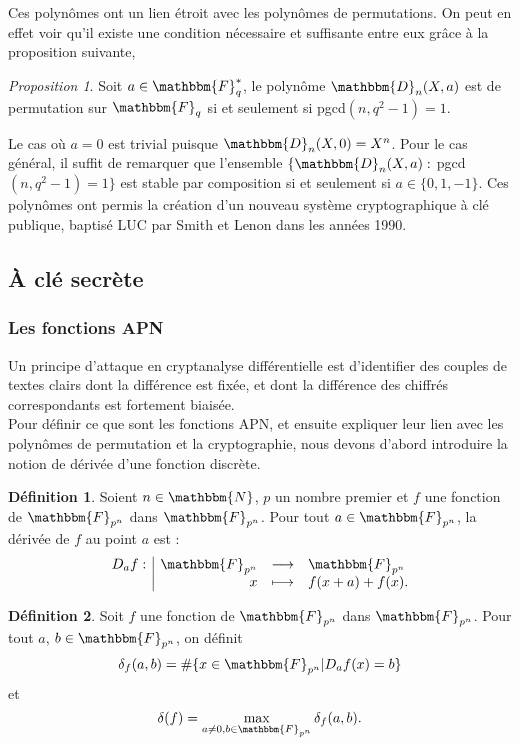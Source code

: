 \documentclass[12pt]{article}
\newcommand{\fonction}[5]{
\begin{displaymath}
\begin{array}{l|rcl}
\displaystyle
#1 : & #2 & \longrightarrow & #3 \\
    & #4 & \longmapsto & #5
\end{array}
\end{displaymath}
}
\theoremstyle{remark}\newtheorem{note}{Note}
\theoremstyle{remark}\newtheorem{nota}{Notation}
\newcommand{\F}{\mathbbm{F}}
\newtheorem{prop}{Proposition}
\theoremstyle{definition}
\newtheorem{definition}{Définition}
\begin{document}
Ces polynômes ont un lien étroit avec les polynômes de permutations. On peut en effet voir qu'il existe une condition nécessaire et suffisante entre eux grâce à la proposition suivante,
\begin{prop}
Soit $a \in \F_q^{*}$, le polynôme $\mathbbm{D}_n(X, a)$ est de permutation sur $\F_q$ si et seulement si pgcd$(n, q^2 -1) = 1$.
\end{prop}
Le cas où $a = 0$ est trivial puisque $\mathbbm{D}_n(X, 0) = X^n$. Pour le cas général, il suffit de remarquer que l'ensemble $ \{ \mathbbm{D}_n(X, a) :  $ pgcd$(n, q^2 -1) = 1 \}$ est stable par composition si et seulement si $a \in \{ 0 , 1, -1 \}$. Ces polynômes ont permis la création d'un nouveau système cryptographique à clé publique, baptisé \textsf{LUC} par Smith et Lenon dans les années 1990.

\vfill \eject


\subsection{À clé secrète}

\subsubsection{Les fonctions APN}
Un principe d'attaque en cryptanalyse différentielle est d'identifier des couples de textes clairs dont la différence est fixée, et dont la différence des chiffrés correspondants est fortement biaisée.\\
Pour définir ce que sont les fonctions APN, et ensuite expliquer leur lien avec les polynômes de permutation et la cryptographie, nous devons d'abord introduire la notion de dérivée d'une fonction discrète.

\begin{definition}
Soient $n \in \mathbbm{N}$, $p$ un nombre premier et $f$ une fonction de $\mathbbm{F}_{p^n}$ dans $\mathbbm{F}_{p^n}$. Pour tout $a \in \mathbbm{F}_{p^n}$, la dérivée de $f$ au point $a$ est : \fonction{D_af}{\F_{p^n}}{\F_{p^n}}{x}{f(x+a)+f(x).}
\end{definition}

\begin{definition}
Soit $f$ une fonction de $\mathbbm{F}_{p^n}$ dans $\mathbbm{F}_{p^n}$. Pour tout $a$, $b \in \mathbbm{F}_{p^n}$, on définit 
$$\delta_f(a,b)=\# \lbrace x\in \mathbbm{F}_{p^n}|D_af(x)=b\rbrace$$
et
$$\delta(f)=\max_{a\neq 0,b\in \mathbbm{F}_{p^n}} \delta_f(a,b).$$
\end{definition}
\end{document}
